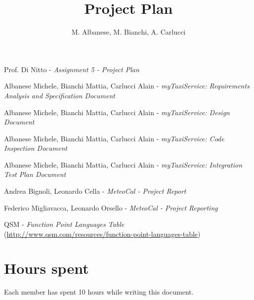 \documentclass[a4paper, 12pt]{article}
\begin{document}
\title{Project Plan}

\author{M. Albanese, M. Bianchi, A. Carlucci}

\maketitle
\newpage{}
\tableofcontents{}

\newpage{}



\newpage



\newpage



\newpage



\newpage



\appendix

\clearpage
{}

\begin{thebibliography}{9}
    Prof. Di Nitto - \emph{Assignment 5 - Project Plan}

        Albanese Michele, Bianchi Mattia, Carlucci Alain - \emph{myTaxiService: Requirements Analysis and Specification Document}

        Albanese Michele, Bianchi Mattia, Carlucci Alain - \emph{myTaxiService: Design Document}

        Albanese Michele, Bianchi Mattia, Carlucci Alain - \emph{myTaxiService: Code Inspection Document}

        Albanese Michele, Bianchi Mattia, Carlucci Alain - \emph{myTaxiService: Integration Test Plan Document}

        Andrea Bignoli, Leonardo Cella - \emph{MeteoCal - Project Report}

    Federico Migliavacca, Leonardo Orsello - \emph{MeteoCal - Project Reporting}

 QSM - \emph{Function Point Languages Table} \small{(\url{http://www.qsm.com/resources/function-point-languages-table})}

\end{thebibliography}

\vfill

\section*{Hours spent}
Each member has spent 10 hours while writing this document.
\end{document}
